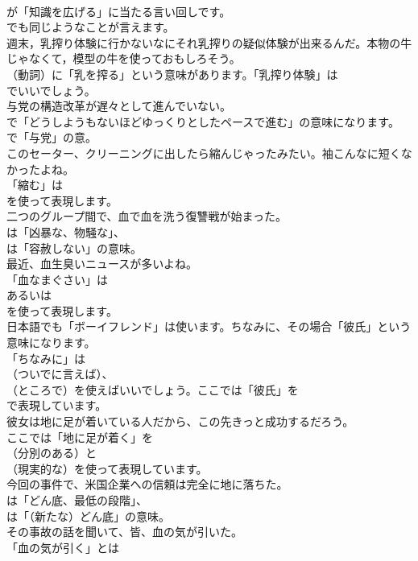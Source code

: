 \documentclass[8pt]{extreport}
\begin{document}
\begin{CJK}{UTF8}{min}
\\	が「知識を広げる」に当たる言い回しです。
\\	でも同じようなことが言えます。	
\\	週末，乳搾り体験に行かないなにそれ乳搾りの疑似体験が出来るんだ。本物の牛じゃなくて，模型の牛を使っておもしろそう。 
\\	（動詞）に「乳を搾る」という意味があります。「乳搾り体験」は
\\	でいいでしょう。	
\\	与党の構造改革が遅々として進んでいない。 
\\	で「どうしようもないほどゆっくりとしたペースで進む」の意味になります。
\\	で「与党」の意。	
\\	このセーター、クリーニングに出したら縮んじゃったみたい。袖こんなに短くなかったよね。 
\\	「縮む」は
\\	を使って表現します。	
\\	二つのグループ間で、血で血を洗う復讐戦が始まった。 
\\	は「凶暴な、物騒な」、
\\	は「容赦しない」の意味。	
\\	最近、血生臭いニュースが多いよね。 
\\	「血なまぐさい」は
\\	あるいは
\\	を使って表現します。	
\\	日本語でも「ボーイフレンド」は使います。ちなみに、その場合「彼氏」という意味になります。 
\\	「ちなみに」は 
\\	（ついでに言えば）、
\\	（ところで）を使えばいいでしょう。ここでは「彼氏」を 
\\	で表現しています。	
\\	彼女は地に足が着いている人だから、この先きっと成功するだろう。 
\\	ここでは「地に足が着く」を
\\	（分別のある）と
\\	（現実的な）を使って表現しています。	
\\	今回の事件で、米国企業への信頼は完全に地に落ちた。 
\\	は「どん底、最低の段階」、
\\	は「（新たな）どん底」の意味。	
\\	その事故の話を聞いて、皆、血の気が引いた。 
\\	「血の気が引く」とは

\end{CJK}
\end{document}
